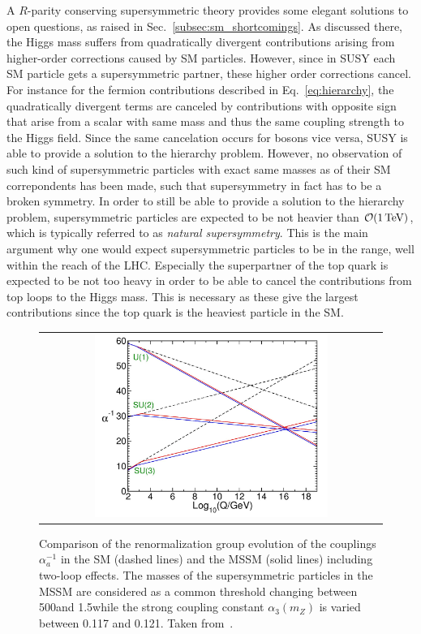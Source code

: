 A $R$-parity conserving supersymmetric theory provides some elegant solutions to open questions, as raised in Sec.~\ref{subsec:sm_shortcomings}. As discussed there, the Higgs mass suffers from quadratically divergent contributions arising from higher-order corrections caused by SM particles. However, since in SUSY each SM particle gets a supersymmetric partner, these higher order corrections cancel. For instance for the fermion contributions described in Eq.~\ref{eq:hierarchy}, the quadratically divergent terms are canceled by contributions with opposite sign that arise from a scalar with same mass and thus the same coupling strength to the Higgs field. Since the same cancelation occurs for bosons vice versa, SUSY is able to provide a solution to the hierarchy problem. However, no observation of such kind of supersymmetric particles with exact same masses as of their SM correpondents has been made, such that supersymmetry in fact has to be a broken symmetry. In order to still be able to provide a solution to the hierarchy problem, supersymmetric particles are expected to be not heavier than $\mathcal{O}(\mathrm{1\,\text{Te}\kern-0.06667em\text{V}})$, which is typically referred to as \textit{natural supersymmetry}. This is the main argument why one would expect supersymmetric particles to be in the \tev range, well within the reach of the LHC. Especially the superpartner of the top quark is expected to be not too heavy in order to be able to cancel the contributions from top loops to the Higgs mass. This is necessary as these give the largest contributions since the top quark is the heaviest particle in the SM. 
\begin{figure}[!tp]
  \centering
  \begin{tabular}{c}
    \includegraphics[width=0.7\textwidth]{figures/Couplings.jpg}
  \end{tabular}
  \caption{Comparison of the renormalization group evolution of the couplings $\alpha_{a}^{-1}$ in the SM (dashed lines) and the MSSM (solid lines) including two-loop effects. The masses of the supersymmetric particles in the MSSM are considered as a common threshold changing between 500\gev and 1.5\tev while the strong coupling constant $\alpha_{3}(m_{Z})$ is varied between 0.117 and 0.121. Taken from~\cite{Martin:1997ns}.}
  \label{fig:couplings}
\end{figure}
